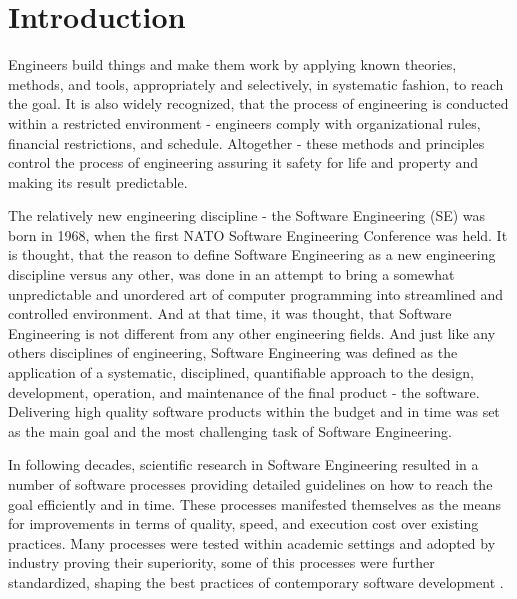 \chapter{Introduction}
Engineers build things and make them work by applying known theories, methods, 
and tools, appropriately and selectively, in systematic fashion, to reach the goal. 
It is also widely recognized, that the process of engineering is conducted 
within a restricted environment - engineers comply with organizational rules, 
financial restrictions, and schedule. Altogether - these methods and principles 
control the process of engineering assuring it safety for life and property and 
making its result predictable.

The relatively new engineering discipline - the Software Engineering (SE) was born in 1968, 
when the first NATO Software Engineering Conference was held. It is thought, that the reason
to define Software Engineering as a new engineering discipline versus any other, was done 
in an attempt to bring a somewhat unpredictable and unordered art of computer programming 
into streamlined and controlled environment.
And at that time, it was thought, that Software Engineering is not different 
from any other engineering fields. And just like any others disciplines of engineering, 
Software Engineering was defined as the application of a systematic, disciplined, quantifiable 
approach to the design, development, operation, and maintenance of the final product - the software.
Delivering high quality software products within the budget and in time was set as the main goal 
and the most challenging task of Software Engineering.

In following decades, scientific research in Software Engineering resulted in a number of software 
processes providing detailed guidelines on how to reach the goal efficiently and in time. 
These processes manifested themselves as the means for improvements in terms of quality, 
speed, and execution cost over existing practices. Many processes were tested within academic 
settings and adopted by industry proving their superiority, some of this processes were 
further standardized, shaping the best practices of contemporary software development \cite{citeulike:9962021}. 

